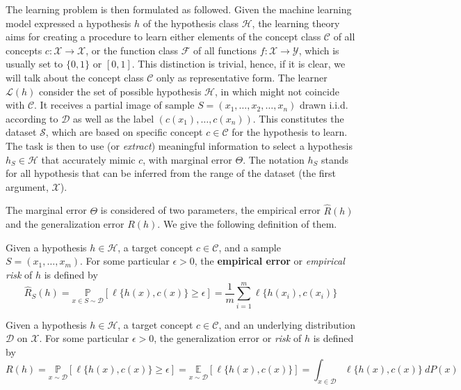 \documentclass[10pt]{article} %
\begin{document}
The learning problem is then formulated as followed. Given the machine learning model expressed a hypothesis $h$ of the hypothesis class $\mathcal{H}$, the learning theory aims for creating a procedure to learn either elements of the concept class $\mathcal{C}$ of all concepts $c: \mathcal{X}\to \mathcal{X}$, or the function class $\mathcal{F}$ of all functions $f: \mathcal{X}\to \mathcal{Y}$, which is usually set to $\{0,1\}$ or $[0,1]$. This distinction is trivial, hence, if it is clear, we will talk about the concept class $\mathcal{C}$ only as representative form. The learner $\mathcal{L}(h)$ consider the set of possible hypothesis $\mathcal{H}$, in which might not coincide with $\mathcal{C}$. It receives a partial image of sample $S=(x_{1},\dots,x_{2},\dots,x_n)$ drawn i.i.d. according to $\mathcal{D}$ as well as the label $(c(x_1),\dots,c(x_n))$. This constitutes the dataset $\mathcal{S}$, which are based on specific concept $c\in \mathcal{C}$ for the hypothesis to learn. The task is then to use (or \textit{extract}) meaningful information to select a hypothesis $h_{S}\in \mathcal{H}$ that accurately mimic $c$, with marginal error $\Theta$. The notation $h_{S}$ stands for all hypothesis that can be inferred from the range of the dataset (the first argument, $\mathcal{X}$). 

The marginal error $\Theta$ is considered of two parameters, the empirical error $\hat{R}(h)$ and the generalization error $R(h)$. We give the following definition of them. 

\begin{definition}
    Given a hypothesis $h\in \mathcal{H}$, a target concept $c\in \mathcal{C}$, and a sample $S=(x_{1},\dots,x_{m})$. For some particular $\epsilon>0$, the \textbf{empirical error} or \textit{empirical risk} of $h$ is defined by\begin{equation}
        \hat{R}_{S}(h) = \underset{x\in S\sim\mathcal{D}}{\mathbb{P}} [\ell\{h(x),c(x)\}\geq \epsilon] =\frac{1}{m} \sum_{i=1}^{m} \ell\{h(x_i),c(x_i)\}
    \end{equation}
\end{definition}

\begin{definition}
    Given a hypothesis $h\in\mathcal{H}$, a target concept $c\in\mathcal{C}$, and an underlying distribution $\mathcal{D}$ on $\mathcal{X}$. For some particular $\epsilon>0$, the generalization error or \textit{risk} of $h$ is defined by
    \begin{equation}
        R(h) = \underset{x\sim\mathcal{D}}{\mathbb{P}} [\ell\{h(x),c(x)\}\geq \epsilon] = \underset{x\sim\mathcal{D}}{\mathbb{E}}[\ell\{h(x),c(x)\}] = \int_{x\in \mathcal{D}} \ell\{h(x),c(x)\} \: dP(x)
    \end{equation}
\end{definition}
\end{document}

